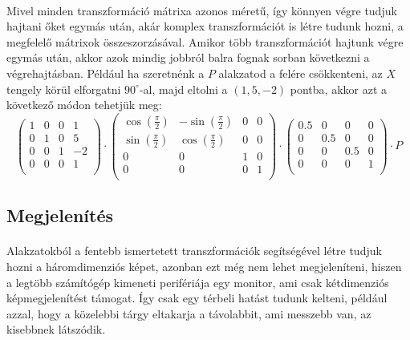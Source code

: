 \documentclass[12pt]{report}
\begin{document}
\paragraph{}
Mivel minden transzformáció mátrixa azonos méretű, így könnyen végre tudjuk hajtani őket egymás után, akár komplex transzformációt is létre tudunk hozni, a megfelelő mátrixok összeszorzásával. Amikor több transzformációt hajtunk végre egymás után, akkor azok mindig jobbról balra fognak sorban következni a végrehajtásban. Például ha szeretnénk a $P$ alakzatod a felére csökkenteni, az $X$ tengely körül elforgatni $90^{\circ}$-al, majd eltolni a $(1,5,-2)$ pontba, akkor azt a következő módon tehetjük meg:
$$
\left( \begin{array}{cccc}
	1 & 0 & 0 & 1 \\
	0 & 1 & 0 & 5 \\
	0 & 0 & 1 & -2 \\
	0 & 0 & 0 & 1 \\
\end{array} \right)
\cdot
\left( \begin{array}{cccc}
	\cos(\frac{\pi}{2}) & -\sin(\frac{\pi}{2}) & 0 & 0 \\
	\sin(\frac{\pi}{2}) & \cos(\frac{\pi}{2}) & 0 & 0 \\
	0 & 0 & 1 & 0 \\
	0 & 0 & 0 & 1 \\
\end{array} \right)
\cdot
\left( \begin{array}{cccc}
	0.5 & 0 & 0 & 0 \\
	0 & 0.5 & 0 & 0 \\
	0 & 0 & 0.5 & 0 \\
	0 & 0 & 0 & 1 \\
\end{array} \right)
\cdot
P
$$
\subsection{Megjelenítés}
\paragraph{}
Alakzatokból a fentebb ismertetett transzformációk segítségével létre tudjuk hozni a háromdimenziós képet, azonban ezt még nem lehet megjeleníteni, hiszen a legtöbb számítógép kimeneti perifériája egy monitor, ami csak kétdimenziós képmegjelenítést támogat. Így csak egy térbeli hatást tudunk kelteni, például azzal, hogy a közelebbi tárgy eltakarja a távolabbit, ami messzebb van, az kisebbnek látszódik.
\end{document}
